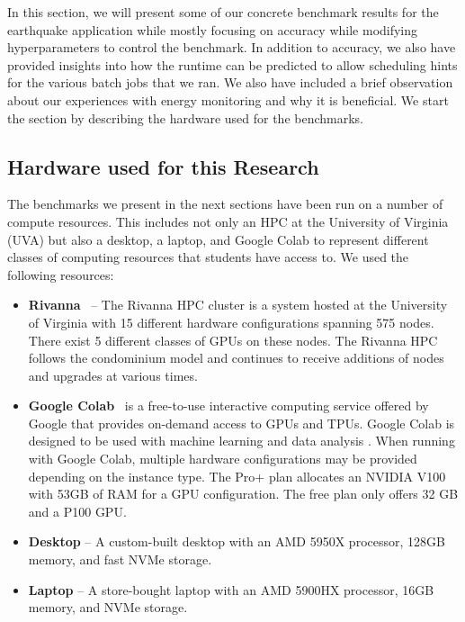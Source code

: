 \documentclass[utf8]{FrontiersinVancouver} %
\begin{document}
In this section, we will present some of our concrete benchmark results for the earthquake application while mostly focusing on accuracy while modifying hyperparameters to control the benchmark. In addition to accuracy, we also have provided insights into how the runtime can be predicted to allow scheduling hints for the various batch jobs that we ran. We also have included a brief observation about our experiences with energy monitoring and why it is beneficial. We start the section by describing the hardware used for the benchmarks.


\subsection{Hardware used for this Research}

The benchmarks we present in the next sections have been run on a number of compute resources. This includes not only an HPC at the University of Virginia (UVA) but also a desktop, a laptop, and Google Colab to represent different classes of computing resources that students have access to. We used the following resources:

\begin{itemize}
\item {\bf Rivanna}~\citep{www-rivanna} -- The Rivanna HPC cluster is  a system hosted at the University of Virginia with 15 different  hardware configurations spanning 575 nodes.  There exist 5 different  classes of GPUs on these nodes. The Rivanna HPC follows the  condominium model and continues to receive additions of nodes and  upgrades at various times.
\item {\bf Google Colab}~\cite{google-colab} is a free-to-use interactive computing service offered by Google that provides on-demand access to GPUs and TPUs. Google Colab is designed to be used with machine learning and data analysis \cite{google-colab}. When running with Google Colab, multiple hardware configurations may be provided depending on the instance type. The Pro+ plan allocates an NVIDIA V100 with 53GB of RAM for a GPU configuration. The free  plan only offers 32 GB and a P100 GPU.
\item {\bf Desktop} -- A custom-built desktop with an AMD 5950X processor, 128GB memory, and fast NVMe storage.
\item {\bf Laptop} -- A store-bought laptop with an AMD 5900HX processor, 16GB memory, and NVMe storage.

\end{itemize}
\end{document}
